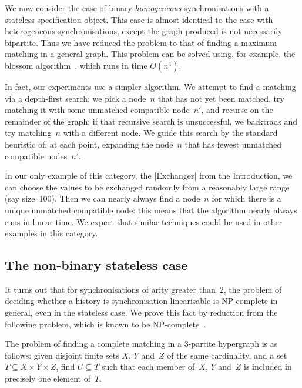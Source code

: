 We now consider the case of binary \emph{homogeneous} synchronisations with a
stateless specification object.  This case is almost identical to the case
with heterogeneous synchronisations, except the graph produced is not
necessarily bipartite.  Thus we have reduced the problem to that of finding a
maximum matching in a general graph.  This problem can be solved using, for
example, the blossom algorithm~\cite{edmonds_1965}, which runs in time
$O(n^4)$.
  


In fact, our experiments use a simpler algorithm.  We attempt to find a
matching via a depth-first search: we pick a node~$n$ that has not yet been
matched, try matching it with some unmatched compatible node~$n'$, and recurse
on the remainder of the graph; if that recursive search is unsuccessful, we
backtrack and try matching~$n$ with a different node.  We guide this search by
the standard heuristic of, at each point, expanding the node~$n$ that has
fewest unmatched compatible nodes~$n'$.  

In our only example of this category, the |Exchanger| from the Introduction,
we can choose the values to be exchanged randomly from a reasonably large
range (say size~100).  Then we can nearly always find a node~$n$ for which
there is a unique unmatched compatible node: this means that the algorithm
nearly always runs in linear time.  We expect that similar techniques could be
used in other examples in this category.



\subsection{The non-binary stateless case}
\label{sec:non-binary-stateless}

It turns out that for synchronisations of arity greater than~2, the problem of
deciding whether a history is synchronisation linearisable is NP-complete in
general, even in the stateless case.  We prove this fact by reduction from the
following problem, which is known to be NP-complete~\cite{Karp1972}.
%
\begin{definition}
The problem of finding a complete matching in a 3-partite hypergraph is as
follows: given disjoint finite sets $X$, $Y$ and~$Z$ of the same cardinality,
and a set $T \subseteq X \times Y \times Z$, find $U \subseteq T$ such that
each member of~$X$, $Y$ and~$Z$ is included in precisely one element of~$T$.
\end{definition}

